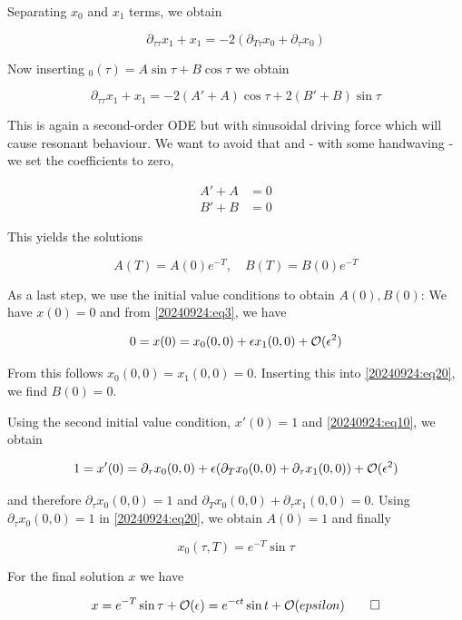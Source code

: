 Separating $x_0$ and $x_1$ terms, we obtain

\begin{equation*}
\partial_{\tau \tau} x_1 + x_1 = - 2 ( \partial_{T \tau} x_0 + \partial_\tau x_0)
\end{equation*}

Now inserting $_0(\tau) = A \sin \tau + B \cos \tau$ we obtain

\begin{equation*}
\partial_{\tau \tau} x_1 + x_1 = -2 (A' + A) \cos \tau + 2(B' + B) \sin \tau
\end{equation*}

This is again a second-order ODE but with sinusoidal driving force which will cause resonant behaviour. We want to avoid that and - with some handwaving - we set the coefficients to zero,

\begin{align*}
    A' + A &= 0 \\
    B' + B &= 0
\end{align*}

This yields the solutions

\begin{equation}\label{20240924:eq20}
A(T) = A(0) e^{-T}, \quad B(T) = B(0) e^{-T}
\end{equation}

As a last step, we use the initial value conditions to obtain $A(0), B(0)$: We have $x(0) = 0$ and from \eqref{20240924:eq3}, we have 

\begin{equation*}
0 = x(0) = x_0(0,0) + \epsilon x_1(0,0) + \mathcal{O}(\epsilon^2)
\end{equation*}

From this follows $x_0(0,0) = x_1(0,0) = 0$. Inserting this into \eqref{20240924:eq20}, we find $B(0) = 0$.

Using the second initial value condition, $x'(0) = 1$ and \eqref{20240924:eq10}, we obtain

\begin{equation*}
1 = x'(0) = \partial_\tau x_0(0,0) + \epsilon ( \partial_T x_0(0,0) + \partial_\tau x_1(0,0) ) + \mathcal{O}(\epsilon^2)
\end{equation*}

and therefore $\partial_\tau x_0(0,0) = 1$ and $\partial_T x_0(0,0) + \partial_\tau x_1(0,0) = 0$. Using $\partial_\tau x_0(0,0) = 1$ in \eqref{20240924:eq20}, we obtain $A(0) = 1$ and finally

\begin{equation*}
x_0(\tau, T) = e^{-T} \sin \tau
\end{equation*}

For the final solution $x$ we have

\begin{equation*}
x = e^{-T} \sin \tau + \mathcal{O}(\epsilon) = e^{-\epsilon t} \sin t + \mathcal{O}(epsilon) \qed
\end{equation*}

